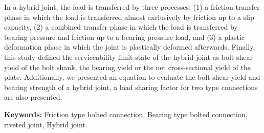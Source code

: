 In a hybrid joint, the load is transferred by three processes: (1) a friction transfer phase in which the load is transferred almost exclusively by friction up to a slip capacity, (2) a combined transfer phase in which the load is transferred by bearing pressure and friction up to a bearing pressure load, and (3) a plastic deformation phase in which the joint is plastically deformed afterwards. Finally, this study defined the serviceability limit state of the hybrid joint as bolt shear yield of the bolt shank, the bearing yield or the net cross-sectional yield of the plate. Additionally, we presented an equation to evaluate the bolt shear yield and bearing strength of a hybrid joint, a load sharing factor for two type connections are also presented.


\textbf{Keywords:} Friction type bolted connection, Bearing type bolted connection, riveted joint, Hybrid joint.